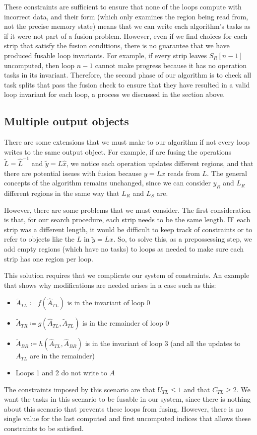 \documentclass[12pt,letterpaper]{article}
\begin{document}
These constraints are sufficient to ensure that none of the loops compute with incorrect data, and their form (which only examines the region being read from, not the precise memory state) means that we can write each algorithm's tasks as if it were not part of a fusion problem.
However, even if we find choices for each strip that satisfy the fusion conditions, there is no guarantee that we have produced fusable loop invariants.
For example, if every strip leaves $S_R[n - 1]$ uncomputed, then loop $n - 1$ cannot make progress because it has no operation tasks in its invariant.
Therefore, the second phase of our algorithm is to check all task splits that pass the fusion check to ensure that they have resulted in a valid loop invariant for each loop, a process we discussed in the section above.
\subsection{Multiple output objects}
There are some extensions that we must make to our algorithm if not every loop writes to the same output object.
For example, if are fusing the operations $\widetilde{L} = \hat{L}^{-1}$ and $\widetilde{y} = L\hat{x}$, we notice each operation updates different regions, and that there are potential issues with fusion because $y = Lx$ reads from $L$.
The general concepts of the algorithm remains unchanged, since we can consider $y_R$ and $L_R$ different regions in the same way that $L_R$ and $L_S$ are.

However, there are some problems that we must consider.
The first consideration is that, for our search procedure, each strip needs to be the same length.
IF each strip was a different length, it would be difficult to keep track of constraints or to refer to objects like the $L$ in $\widetilde{y} = Lx$.
So, to solve this, as a prepossessing step, we add empty regions (which have no tasks) to loops as needed to make sure each strip has one region per loop.

This solution requires that we complicate our system of constraints.
An example that shows why modifications are needed arises in a case such as this:
\begin{itemize}
\item $\widetilde{A}_{TL} \coloneqq f(\hat{A}_{TL})$ is in the invariant of loop 0
\item $\widetilde{A}_{TR} \coloneqq g(\hat{A}_{TL}, \widetilde{A}_{TL})$ is in the remainder of loop 0
\item $\widetilde{A}_{BR} \coloneqq h(\hat{A}_{TL}, \hat{A}_{BR})$ is in the invariant of loop 3 (and all the updates to $A_{TL}$ are in the remainder)
\item Loops 1 and 2 do not write to $A$
\end{itemize}
The constraints imposed by this scenario are that $U_{TL} \leq 1$ and that $C_{TL} \geq 2$.
We want the tasks in this scenario to be fusable in our system, since there is nothing about this scenario that prevents these loops from fusing.
However, there is no single value for the last computed and first uncomputed indices that allows these constraints to be satisfied.
\end{document}
